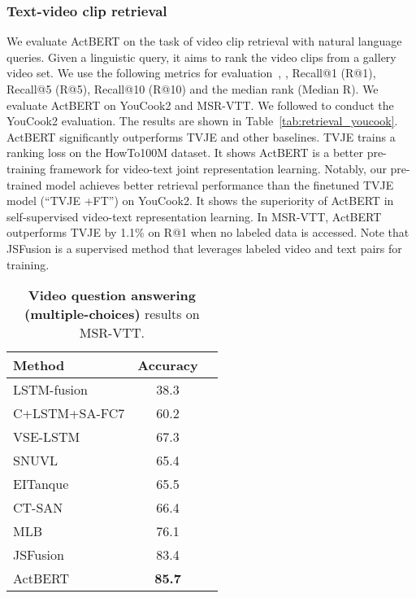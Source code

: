 \documentclass[10pt,twocolumn,letterpaper]{article}
\newcommand{\ours}{ActBERT\xspace}
\begin{document}
\subsubsection{Text-video clip retrieval}
We evaluate \ours on the task of video clip retrieval with natural language queries. 
Given a linguistic query, it aims to rank the video clips from a gallery video set.
We use the following metrics for evaluation~\cite{miech2019howto100m}, \ie, Recall@1 (R@1), Recall@5 (R@5), Recall@10 (R@10) and the median rank (Median R).
We evaluate \ours on YouCook2 and MSR-VTT. We followed \cite{miech2019howto100m} to conduct the YouCook2 evaluation.
The results are shown in Table~\ref{tab:retrieval_youcook}.
\ours significantly outperforms TVJE \cite{miech2019howto100m} and other baselines. TVJE trains a  ranking loss on the HowTo100M dataset. It shows \ours is a better pre-training framework for video-text joint representation learning. Notably, our pre-trained model achieves better retrieval performance than the finetuned TVJE model (``TVJE +FT'') on YouCook2. It shows the superiority of \ours in self-supervised video-text representation learning.
In MSR-VTT, \ours outperforms TVJE by 1.1\% on R@1 when no labeled data is accessed. Note that JSFusion \cite{yu2018joint} is a supervised method that leverages labeled video and text pairs for training.

\begin{table}[tb]
\centering
\small
\begin{tabular}{l|cc|}
\hline
Method  & {\footnotesize Accuracy}   \\ 
\midrule
LSTM-fusion \cite{yu2018joint}             & 38.3        \\ 
C+LSTM+SA-FC7 \cite{torabi2016learning}     & 60.2      \\
VSE-LSTM \cite{kiros2014unifying}            & 67.3       \\ 
SNUVL  \cite{yu2016video}                & 65.4      \\ 
EITanque \cite{kaufman2017temporal}          & 65.5       \\
CT-SAN           \cite{yu2017end}       & 66.4     \\ 
MLB \cite{kim2016hadamard}                   & 76.1       \\
JSFusion  \cite{yu2018joint}                                  & 83.4  \\ 
\midrule
\ours & \textbf{85.7} \\
\bottomrule
\hline
\end{tabular}
\caption{
\textbf{Video question answering (multiple-choices)} results on MSR-VTT.
}
\label{tbl:results_mc}
\end{table}
\end{document}
